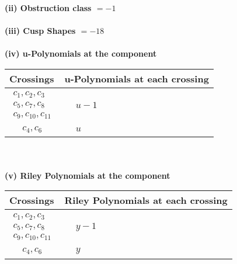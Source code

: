 \documentclass[1p]{elsarticle_modified}
\theoremstyle{definition}
\begin{document}
\flushleft \textbf{(ii) Obstruction class $= -1$}\\~\\
\flushleft \textbf{(iii) Cusp Shapes $= -18$}\\~\\
\newpage\renewcommand{\arraystretch}{1}
\flushleft \textbf{(iv) u-Polynomials at the component}\newline \\
\begin{tabular}{m{50pt}|m{274pt}}
Crossings & \hspace{64pt}u-Polynomials at each crossing \\
\hline $$\begin{aligned}c_{1},c_{2},c_{3}\\c_{5},c_{7},c_{8}\\c_{9},c_{10},c_{11}\end{aligned}$$&$\begin{aligned}
&u-1
\end{aligned}$\\
\hline $$\begin{aligned}c_{4},c_{6}\end{aligned}$$&$\begin{aligned}
&u
\end{aligned}$\\
\hline
\end{tabular}\\~\\
\newpage\renewcommand{\arraystretch}{1}
\flushleft \textbf{(v) Riley Polynomials at the component}\newline \\
\begin{tabular}{m{50pt}|m{274pt}}
Crossings & \hspace{64pt}Riley Polynomials at each crossing \\
\hline $$\begin{aligned}c_{1},c_{2},c_{3}\\c_{5},c_{7},c_{8}\\c_{9},c_{10},c_{11}\end{aligned}$$&$\begin{aligned}
&y-1
\end{aligned}$\\
\hline $$\begin{aligned}c_{4},c_{6}\end{aligned}$$&$\begin{aligned}
&y
\end{aligned}$\\
\hline
\end{tabular}\\~\\
\end{document}

